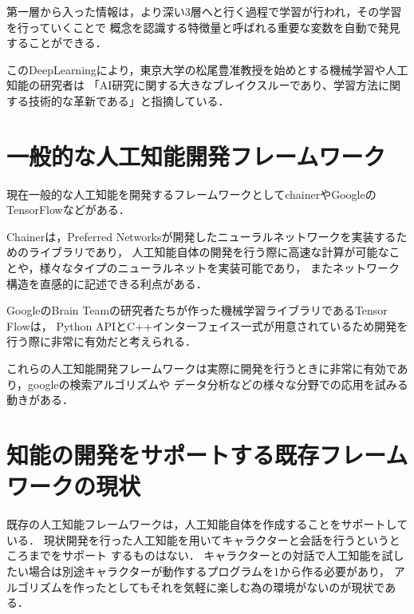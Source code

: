 第一層から入った情報は，より深い3層へと行く過程で学習が行われ，その学習を行っていくことで
概念を認識する特徴量と呼ばれる重要な変数を自動で発見することができる．

このDeepLearningにより，東京大学の松尾豊准教授\cite{boom}を始めとする機械学習や人工知能の研究者は
「AI研究に関する大きなブレイクスルーであり、学習方法に関する技術的な革新である」と指摘している．

\section{一般的な人工知能開発フレームワーク}
現在一般的な人工知能を開発するフレームワークとしてchainerやGoogleのTensorFlowなどがある．

Chainerは，Preferred Networksが開発したニューラルネットワークを実装するためのライブラリであり，
人工知能自体の開発を行う際に高速な計算が可能なことや，様々なタイプのニューラルネットを実装可能であり，
またネットワーク構造を直感的に記述できる利点がある．

GoogleのBrain Teamの研究者たちが作った機械学習ライブラリであるTensor Flowは，
Python APIとC++インターフェイス一式が用意されているため開発を行う際に非常に有効だと考えられる．

これらの人工知能開発フレームワークは実際に開発を行うときに非常に有効であり，googleの検索アルゴリズムや
データ分析などの様々な分野での応用を試みる動きがある．

\section{知能の開発をサポートする既存フレームワークの現状}
既存の人工知能フレームワークは，人工知能自体を作成することをサポートしている．
現状開発を行った人工知能を用いてキャラクターと会話を行うというところまでをサポート
するものはない．
キャラクターとの対話で人工知能を試したい場合は別途キャラクターが動作するプログラムを1から作る必要があり，
アルゴリズムを作ったとしてもそれを気軽に楽しむ為の環境がないのが現状である．
